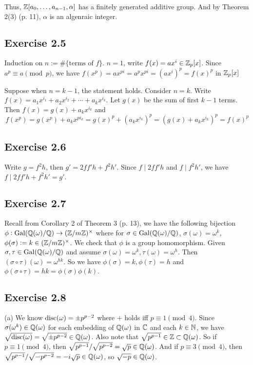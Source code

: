 \documentclass[../Marcus.tex]{subfiles}
\begin{document}
Thus, $\mathbb{Z}[a_0,\ldots,a_{n-1},\alpha]$ has a finitely generated additive group. And by Theorem 2(3) (p. 11), $\alpha$ is an algenraic integer.  

\subsection*{Exercise 2.5}

Induction on $n:=\#\{\text{terms of }f\}$. $n=1$, write $f(x)=ax^i \in \mathbb{Z}_p[x]$. Since $a^p \equiv a \pmod{p}$, we have $f(x^p)=ax^{pi}=a^px^{pi}=(ax^i)^p=f(x)^p$ in $\mathbb{Z}_p[x]$

Suppose when $n=k-1$, the statement holds. Consider $n=k$. Write $f(x)=a_1x^{i_1}+a_2x^{i_2}+\cdots+a_kx^{i_k}$. Let $g(x)$ be the sum of first $k-1$ terms. Then $f(x)=g(x)+a_kx^{i_k}$ and $$f(x^p)=g(x^p)+a_kx^{pi_k}=g(x)^p+(a_kx^{i_k})^p=\left(g(x)+a_kx^{i_k}\right)^p=f(x)^p$$

\subsection*{Exercise 2.6}

Write $g=f^2h$, then $g'=2ff'h+f^2h'$. Since $f\mid 2ff'h$ and $f\mid f^2h'$, we have $f\mid 2ff'h+f^2h'=g'$.

\subsection*{Exercise 2.7}

Recall from Corollary 2 of Theorem 3 (p. 13), we have the following bijection $\phi: \operatorname{Gal}(\mathbb{Q}(\omega)/\mathbb{Q})\to(\mathbb{Z}/m\mathbb{Z})^{\times}$ where for $\sigma\in \operatorname{Gal}(\mathbb{Q}(\omega)/\mathbb{Q})$, $\sigma(\omega)=\omega^k$, $\phi(\sigma):=k\in(\mathbb{Z}/m\mathbb{Z})^{\times}$. We check that $\phi$ is a group homomorphism. Given $\sigma,\tau\in\operatorname{Gal}(\mathbb{Q}(\omega)/\mathbb{Q})$ and assume $\sigma(\omega)=\omega^k,\tau(\omega)=\omega^h$. Then $(\sigma\circ\tau)(\omega)=\omega^{hk}$. So we have $\phi(\sigma)=k, \phi(\tau)=h$ and $\phi(\sigma\circ\tau)=hk=\phi(\sigma)\phi(k)$.

\subsection*{Exercise 2.8}

(a) We know
$\operatorname{disc}(\omega)=\pm p^{p-2}$ where $+$ holds iff $p\equiv 1 \pmod{4}$. Since $\sigma(\omega^k)\in\mathbb{Q}(\omega)$ for each embedding of $\mathbb{Q}(\omega)$ in $\mathbb{C}$ and each $k\in\mathbb{N}$, we have $\sqrt{\operatorname{disc}(\omega)}=\sqrt{\pm p^{p-2}} \in \mathbb{Q}(\omega)$. Also note that $\sqrt{p^{p-1}} \in \mathbb{Z} \subset \mathbb{Q}(\omega)$. So if $p\equiv 1 \pmod{4}$, then $\sqrt{p^{p-1}}/\sqrt{p^{p-2}} = \sqrt{p} \in \mathbb{Q}(\omega)$. And if $p\equiv 3 \pmod{4}$, then $\sqrt{p^{p-1}}/\sqrt{-p^{p-2}} = -i\sqrt{p} \in \mathbb{Q}(\omega)$, so $\sqrt{-p}\in\mathbb{Q}(\omega)$.
\end{document}
